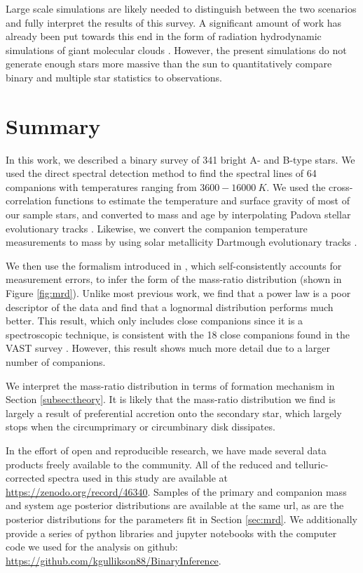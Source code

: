 \documentclass{emulateapj}
\begin{document}
Large scale simulations are likely needed to distinguish between the two scenarios and fully interpret the results of this survey. A significant amount of work has already been put towards this end in the form of radiation hydrodynamic simulations of giant molecular clouds \citep{Bate2012, Krumholz2012}. However, the present simulations do not generate enough stars more massive than the sun to quantitatively compare binary and multiple star statistics to observations. 


\section{Summary}

In this work, we described a binary survey of 341 bright A- and B-type stars. We used the direct spectral detection method \citep{Gullikson2016} to find the spectral lines of 64 companions with temperatures ranging from $3600 - 16000\ K$.  We used the cross-correlation functions to estimate the temperature and surface gravity of most of our sample stars, and converted to mass and age by interpolating Padova stellar evolutionary tracks \citep{Bressan2012}. Likewise, we convert the companion temperature measurements to mass by using solar metallicity Dartmough evolutionary tracks \citep{Dotter2008}. 

We then use the formalism introduced in \citet{Foreman2014}, which self-consistently accounts for measurement errors, to infer the form of the mass-ratio distribution (shown in Figure \ref{fig:mrd}). Unlike most previous work, we find that a power law is a poor descriptor of the data and find that a lognormal distribution performs much better. This result, which only includes close companions since it is a spectroscopic technique, is consistent with the 18 close companions found in the VAST survey \citep{DeRosa2014}. However, this result shows much more detail due to a larger number of companions. 

We interpret the mass-ratio distribution in terms of formation mechanism in Section \ref{subsec:theory}. It is likely that the mass-ratio distribution we find is largely a result of preferential accretion onto the secondary star, which largely stops when the circumprimary or circumbinary disk dissipates.

In the effort of open and reproducible research, we have made several data products freely available to the community. All of the reduced and telluric-corrected spectra used in this study are available at \url{https://zenodo.org/record/46340}. Samples of the primary and companion mass and system age posterior distributions are available at the same url, as are the posterior distributions for the parameters fit in Section \ref{sec:mrd}. We additionally provide a series of python libraries and jupyter notebooks with the computer code we used for the analysis on github: \url{https://github.com/kgullikson88/BinaryInference}.
\end{document}
